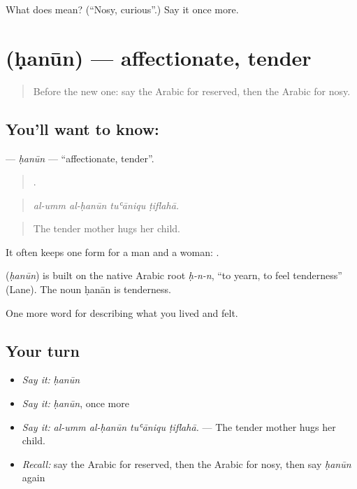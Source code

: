 \begin{tcolorbox}[breakable,colback=teal!4,colframe=teal!35!black,title={Before you move on}]
What does  mean? (\textquotedblleft{}Nosy, curious\textquotedblright{}.) Say it once more.
\end{tcolorbox}
\section[\texorpdfstring{\ar{حنون} (ḥanūn)}{حنون (ḥanūn)}]{ (ḥanūn) — affectionate, tender}

\label{lesson:AR-C502-hanun}



\begin{quote}
Before the new one: say the Arabic for reserved, then the Arabic for nosy.
\end{quote}

\subsection*{You'll want to know: }
\textbf{} — \emph{ḥanūn} — \textquotedblleft{}affectionate, tender\textquotedblright{}.

\begin{quote}
   .
\end{quote}

\begin{quote}
\emph{al-umm al-ḥanūn tuʿāniqu ṭiflahā.}
\end{quote}

\begin{quote}
The tender mother hugs her child.
\end{quote}

It often keeps one form for a man and a woman:  .

\begin{cousinweb}
\textbf{} (\emph{ḥanūn}) is built on the native Arabic root \emph{ḥ-n-n}, \textquotedblleft{}to yearn, to feel tenderness\textquotedblright{} (Lane). The noun ḥanān is tenderness.
\end{cousinweb}

\begin{grammarlens}[title={What you've built}]
One more word for describing what you lived and felt.
\end{grammarlens}

\subsection*{Your turn}
\begin{itemize}
\raggedright
  \item \emph{Say it:} \emph{ḥanūn}
  \item \emph{Say it:} \emph{ḥanūn}, once more
  \item \emph{Say it:} \emph{al-umm al-ḥanūn tuʿāniqu ṭiflahā.} — The tender mother hugs her child.
  \item \emph{Recall:} say the Arabic for reserved, then the Arabic for nosy, then say \emph{ḥanūn} again
\end{itemize}

